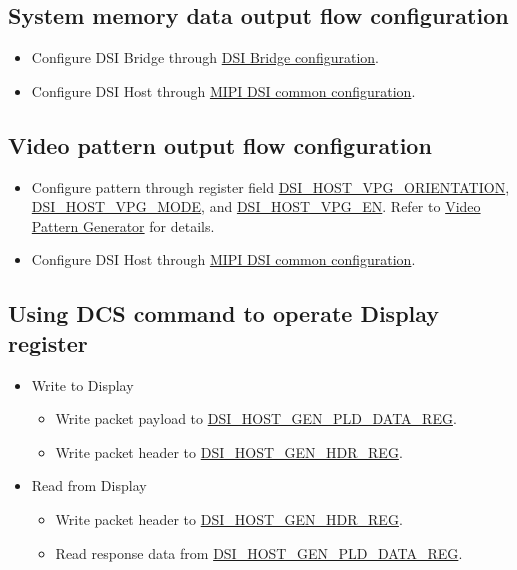 \documentclass[main\_\_EN.tex]{subfiles}
\begin{document}
\subsection{System memory data output flow configuration}
\begin{itemize}
    \item Configure DSI Bridge through \hyperref[sec:dsi-bridge-configuration]{DSI Bridge configuration}.
    \item Configure DSI Host through \hyperref[sec:mipidsi-dsi-common-programming-proc]{MIPI DSI common configuration}.
\end{itemize}

\subsection{Video pattern output flow configuration}
\begin{itemize}
    \item Configure pattern through register field \hyperref[fielddesc:DSIHOSTVPGORIENTATION]{DSI\_HOST\_VPG\_ORIENTATION}, \hyperref[fielddesc:DSIHOSTVPGMODE]{DSI\_HOST\_VPG\_MODE}, and \hyperref[fielddesc:DSIHOSTVPGEN]{DSI\_HOST\_VPG\_EN}. Refer to \hyperref[sec:video-pattern-generator]{Video Pattern Generator} for details.
    \item Configure DSI Host through \hyperref[sec:mipidsi-dsi-common-programming-proc]{MIPI DSI common configuration}.
\end{itemize}



\subsection{Using DCS command to operate Display register}
\begin{itemize}
    \item Write to Display
        \begin{itemize}
            \item Write packet payload to \hyperref[regdesc:DSIHOSTGENPLDDATAREG]{DSI\_HOST\_GEN\_PLD\_DATA\_REG}.
            \item Write packet header to \hyperref[regdesc:DSIHOSTGENHDRREG]{DSI\_HOST\_GEN\_HDR\_REG}.
        \end{itemize}
    \item Read from Display
        \begin{itemize}
            \item Write packet header to \hyperref[regdesc:DSIHOSTGENHDRREG]{DSI\_HOST\_GEN\_HDR\_REG}.
            \item Read response data from \hyperref[regdesc:DSIHOSTGENPLDDATAREG]{DSI\_HOST\_GEN\_PLD\_DATA\_REG}.
        \end{itemize}
\end{itemize}
\end{document}
